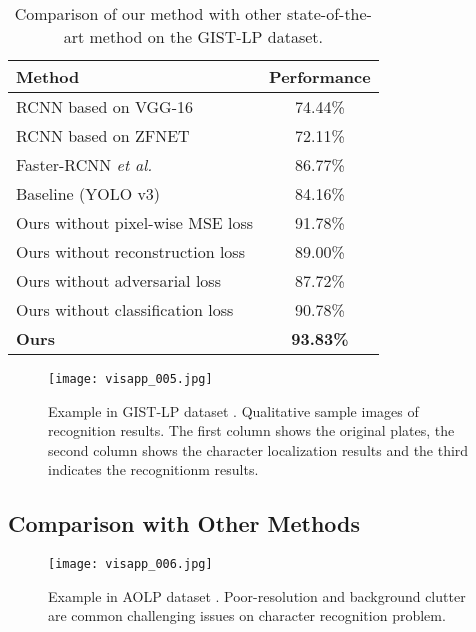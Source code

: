 \documentclass[a4paper,twoside]{article}
\begin{document}
\setlength{\tabcolsep}{10pt}
    \begin{table*}
    \begin{center}
    \caption{Comparison of our method with other state-of-the-art method on the GIST-LP dataset.}
    \label{table:headings}
    \begin{tabular}{l|c}
    \hline
    Method $\qquad\qquad\qquad$& Performance \\
    \hline\hline
    \noalign{\smallskip}
    RCNN based on VGG-16 \cite{girshick2014rich} & 74.44\% \\ RCNN based on ZFNET \cite{girshick2014rich} & 72.11\% \\  Faster-RCNN \textit{et al.} \cite{ren2015faster} & 86.77\% \\ \hline\hline Baseline (YOLO v3) \cite{redmon2018yolov3} & 84.16\% \\ Ours without pixel-wise MSE loss & 91.78\% \\ Ours without reconstruction loss & 89.00\% \\ Ours without adversarial loss & 87.72\% \\ Ours without classification loss & 90.78\% \\ \textbf{Ours} & \textbf{93.83\%} \\ \hline
    \end{tabular}
    \end{center}
    \end{table*}
    \setlength{\tabcolsep}{1.4pt} 
    
\begin{figure}[t]
    \begin{center}
\texttt{[image: visapp\_005.jpg]}
    \end{center}
       \caption{Example in GIST-LP dataset \cite{laroca2018robust}. Qualitative sample images of recognition results. The first column shows the original plates, the second column shows the character localization results and the third indicates the recognitionm results.}
    \label{fig:long}
    \label{fig:onecol}
    \end{figure}

\subsection{Comparison with Other Methods}


\begin{figure*}[t]
    \begin{center}
\texttt{[image: visapp\_006.jpg]}
    \end{center}
       \caption{Example in AOLP dataset \cite{hsu2013application}. Poor-resolution and background clutter are common challenging issues on character recognition problem.}
    \label{fig:long}
    \label{fig:onecol}
    \end{figure*}
    
\end{document}
